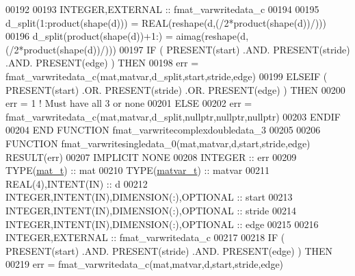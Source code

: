 \begin{DoxyCode}
00192 
00193     \textcolor{keywordtype}{INTEGER},\textcolor{keywordtype}{EXTERNAL}                         :: fmat\_varwritedata\_c
00194 
00195     d\_split(1:product(shape(d)))  = \textcolor{keywordtype}{REAL}(reshape(d,(/2*product(shape(d))/)))
00196     d\_split(product(shape(d))+1:) = aimag(reshape(d,(/2*product(shape(d))/)))
00197     \textcolor{keywordflow}{IF} ( \textcolor{keyword}{PRESENT}(start) .AND. \textcolor{keyword}{PRESENT}(stride) .AND. \textcolor{keyword}{PRESENT}(edge) ) \textcolor{keywordflow}{THEN}
00198         err = fmat\_varwritedata\_c(mat,matvar,d\_split,start,stride,edge)
00199     \textcolor{keywordflow}{ELSEIF} ( \textcolor{keyword}{PRESENT}(start) .OR. \textcolor{keyword}{PRESENT}(stride) .OR. \textcolor{keyword}{PRESENT}(edge) ) \textcolor{keywordflow}{THEN}
00200         err = 1    \textcolor{comment}{! Must have all 3 or none}
00201     \textcolor{keywordflow}{ELSE}
00202         err = fmat\_varwritedata\_c(mat,matvar,d\_split,nullptr,nullptr,nullptr)
00203 \textcolor{keywordflow}{    ENDIF}
00204 \textcolor{keyword}{END FUNCTION }fmat\_varwritecomplexdoubledata\_3
00205 
00206 \textcolor{keyword}{FUNCTION }fmat\_varwritesingledata\_0(mat,matvar,d,start,stride,edge) \textcolor{keyword}{RESULT}(err)
00207 \textcolor{keywordtype}{IMPLICIT NONE}
00208     \textcolor{keywordtype}{INTEGER}                                  :: err
00209     \textcolor{keywordtype}{TYPE}(\hyperlink{group___m_a_t_gab0fc888f5a5d79943b16284b1f91c2e8}{mat\_t})                              :: mat
00210     \textcolor{keywordtype}{TYPE}(\hyperlink{group___m_a_t_structmatvar__t}{matvar\_t})                           :: matvar
00211     \textcolor{keywordtype}{REAL(4)},\textcolor{keywordtype}{INTENT(IN)}                       :: d
00212     \textcolor{keywordtype}{INTEGER},\textcolor{keywordtype}{INTENT(IN)},\textcolor{keywordtype}{DIMENSION(:)},\textcolor{keywordtype}{OPTIONAL} :: start
00213     \textcolor{keywordtype}{INTEGER},\textcolor{keywordtype}{INTENT(IN)},\textcolor{keywordtype}{DIMENSION(:)},\textcolor{keywordtype}{OPTIONAL} :: stride
00214     \textcolor{keywordtype}{INTEGER},\textcolor{keywordtype}{INTENT(IN)},\textcolor{keywordtype}{DIMENSION(:)},\textcolor{keywordtype}{OPTIONAL} :: edge
00215 
00216     \textcolor{keywordtype}{INTEGER},\textcolor{keywordtype}{EXTERNAL}                         :: fmat\_varwritedata\_c
00217 
00218     \textcolor{keywordflow}{IF} ( \textcolor{keyword}{PRESENT}(start) .AND. \textcolor{keyword}{PRESENT}(stride) .AND. \textcolor{keyword}{PRESENT}(edge) ) \textcolor{keywordflow}{THEN}
00219         err = fmat\_varwritedata\_c(mat,matvar,d,start,stride,edge)

\end{DoxyCode}
